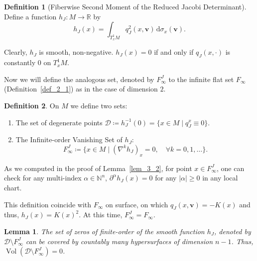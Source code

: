 \documentclass[reqno,11pt]{article}
\newtheorem{lemma}{Lemma}[section]
\theoremstyle{definition}
\newtheorem{definition}{Definition}[section]
\theoremstyle{remark}
\numberwithin{equation}{section}
\DeclareMathOperator{\vol}{Vol}
\begin{document}
\begin{definition}[Fiberwise Second Moment of the Reduced Jacobi Determinant]
	Define a function $h_J:M\to\mathbb{R}$ by
	\begin{displaymath}
		h_{J}(x)=\int_{T^{1}_{x}M}q_{J}^{2}(x,\bm{v})\,\mathrm{d}\sigma_{x}(\bm{v}).
	\end{displaymath}

	Clearly, $h_{J}$ is smooth, non-negative. $h_{J}(x)=0$ if and only if $q_{J}(x,\cdot)$ is constantly $0$ on $T^{1}_{x}M$.
\end{definition}

Now we will define the analogous set, denoted by $F^{J}_{\infty}$ to the infinite flat set $F_{\infty}$ (Definition~\ref{def_2_1}) as in the case of dimension $2$.

\begin{definition}
	On $M$ we define two sets:
	\begin{enumerate}
		\item The set of degenerate points $\mathcal{D}\coloneq h_{J}^{-1}(0)=\{x\in M\mid q_{J}^{x}\equiv 0\}$.
		\item The Infinite-order Vanishing Set of $h_{J}$:
		      \begin{displaymath}
			      F_{\infty}^{J}\coloneq\{x\in M\mid {(\nabla^{k}h_{J})}_{x}=0,\quad \forall k=0,1,\ldots\}.
		      \end{displaymath}
	\end{enumerate}
\end{definition}

As we computed in the proof of Lemma~\ref{lem_3_2}, for point $x\in F^{J}_{\infty}$, one can check for any multi-index $\alpha\in\mathbb{N}^{n}$, $\partial^{\alpha}h_{J}(x)=0$ for any $|\alpha|\ge 0$ in any local chart.

This definition coincide with $F_{\infty}$ on surface, on which $q_{J}(x,\bm{v})=-K(x)$ and thus, $h_{J}(x)={K(x)}^2$. At this time, $F^{J}_{\infty}=F_{\infty}$.

\begin{lemma}\label{lem_5_2}
	The set of zeros of finite-order of the smooth function $h_{J}$, denoted by $\mathcal{D}\setminus F^{J}_{\infty}$ can be covered by countably many hypersurfaces of dimension $n-1$. Thus, $\vol(\mathcal{D}\setminus F^{J}_{\infty})=0$.
\end{lemma}
\end{document}
